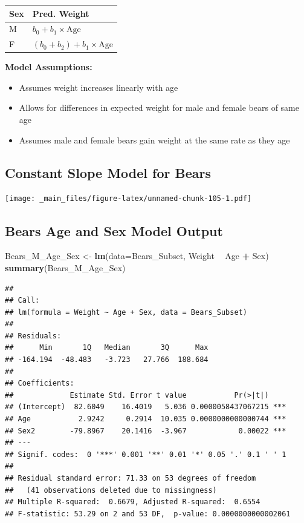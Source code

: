 \documentclass[]{book}
\newenvironment{Shaded}{\begin{snugshade}}{\end{snugshade}}
\newcommand{\KeywordTok}[1]{\textcolor[rgb]{0.13,0.29,0.53}{\textbf{#1}}}
\newcommand{\DataTypeTok}[1]{\textcolor[rgb]{0.13,0.29,0.53}{#1}}
\newcommand{\StringTok}[1]{\textcolor[rgb]{0.31,0.60,0.02}{#1}}
\newcommand{\OperatorTok}[1]{\textcolor[rgb]{0.81,0.36,0.00}{\textbf{#1}}}
\newcommand{\NormalTok}[1]{#1}
\providecommand{\tightlist}{%
  \setlength{\itemsep}{0pt}\setlength{\parskip}{0pt}}
\begin{document}
\begin{longtable}[]{@{}ll@{}}
\toprule
Sex & Pred. Weight\tabularnewline
\midrule
\endhead
M & \(b_0 + b_1 \times\text{Age}\)\tabularnewline
F & \((b_0 + b_2) + b_1 \times\text{Age}\)\tabularnewline
\bottomrule
\end{longtable}

\textbf{Model Assumptions:}

\begin{itemize}
\tightlist
\item
  Assumes weight increases linearly with age\\
\item
  Allows for differences in expected weight for male and female bears of
  same age\\
\item
  Assumes male and female bears gain weight at the same rate as they age
\end{itemize}

\subsection{Constant Slope Model for
Bears}\label{constant-slope-model-for-bears}

\texttt{[image: \_main\_files/figure-latex/unnamed-chunk-105-1.pdf]}

\subsection{Bears Age and Sex Model
Output}\label{bears-age-and-sex-model-output}

\begin{Shaded}
\begin{Highlighting}[]
\NormalTok{Bears_M_Age_Sex <-}\StringTok{ }\KeywordTok{lm}\NormalTok{(}\DataTypeTok{data=}\NormalTok{Bears_Subset, Weight }\OperatorTok{~}\StringTok{ }\NormalTok{Age }\OperatorTok{+}\StringTok{ }\NormalTok{Sex)}
\KeywordTok{summary}\NormalTok{(Bears_M_Age_Sex)}
\end{Highlighting}
\end{Shaded}

\begin{verbatim}
## 
## Call:
## lm(formula = Weight ~ Age + Sex, data = Bears_Subset)
## 
## Residuals:
##      Min       1Q   Median       3Q      Max 
## -164.194  -48.483   -3.723   27.766  188.684 
## 
## Coefficients:
##             Estimate Std. Error t value           Pr(>|t|)    
## (Intercept)  82.6049    16.4019   5.036 0.0000058437067215 ***
## Age           2.9242     0.2914  10.035 0.0000000000000744 ***
## Sex2        -79.8967    20.1416  -3.967            0.00022 ***
## ---
## Signif. codes:  0 '***' 0.001 '**' 0.01 '*' 0.05 '.' 0.1 ' ' 1
## 
## Residual standard error: 71.33 on 53 degrees of freedom
##   (41 observations deleted due to missingness)
## Multiple R-squared:  0.6679, Adjusted R-squared:  0.6554 
## F-statistic: 53.29 on 2 and 53 DF,  p-value: 0.0000000000002061
\end{verbatim}
\end{document}
